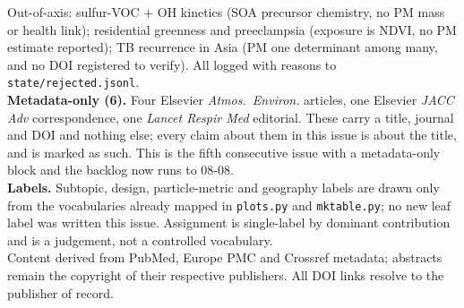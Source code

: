 \documentclass[10pt]{article}
\begin{document}
\begin{keybox}
{Out-of-axis: sulfur-VOC + OH kinetics (SOA precursor chemistry, no PM mass or health
link); residential greenness and preeclampsia (exposure is NDVI, no PM estimate
reported); TB recurrence in Asia (PM one determinant among many, and no DOI registered to
verify). All logged with reasons to \texttt{state/rejected.jsonl}.\\[0.8mm]
\textbf{Metadata-only (6).} Four Elsevier \textit{Atmos.\ Environ.} articles, one
Elsevier \textit{JACC Adv} correspondence, one \textit{Lancet Respir Med} editorial. These
carry a title, journal and DOI and nothing else; every claim about them in this issue is
about the title, and is marked as such. This is the fifth consecutive issue with a
metadata-only block and the backlog now runs to 08-08.\\[0.8mm]
\textbf{Labels.} Subtopic, design, particle-metric and geography labels are drawn only
from the vocabularies already mapped in \texttt{plots.py} and \texttt{mktable.py}; no new
leaf label was written this issue. Assignment is single-label by dominant contribution
and is a judgement, not a controlled vocabulary.\\[0.8mm]
Content derived from PubMed, Europe PMC and Crossref metadata; abstracts remain the
copyright of their respective publishers. All DOI links resolve to the publisher of
record.\par}
\end{keybox}
\end{document}
